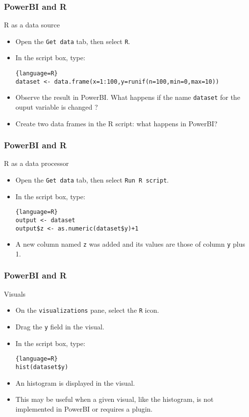 \documentclass[main.tex]{subfiles}
\begin{document}
\begin{frame}[fragile]
    \frametitle{PowerBI and R}
\begin{block}{R as a data source}
    \begin{itemize}
        \item<+-> Open the \texttt{Get data} tab, then select \texttt{R}.
        \item<+-> In the script box, type:
        \begin{lstlisting}{language=R}
dataset <- data.frame(x=1:100,y=runif(n=100,min=0,max=10))
        \end{lstlisting}
        \item<+-> Observe the result in PowerBI. What happens if the name \texttt{dataset} for the ouput variable is changed ?
        \item<+-> Create two data frames in the R script: what happens in PowerBI?
    \end{itemize}
\end{block}
\end{frame}
\begin{frame}[fragile]
    \frametitle{PowerBI and R}
\begin{block}{R as a data processor}
    \begin{itemize}
        \item<+-> Open the \texttt{Get data} tab, then select \texttt{Run R script}.
        \item<+-> In the script box, type:
        \begin{lstlisting}{language=R}
output <- dataset
output$z <- as.numeric(dataset$y)+1
        \end{lstlisting}
        \item<+-> A new column named \texttt{z} was added and its values are those of column \texttt{y} plus 1.
    \end{itemize}
\end{block}
\end{frame}
\begin{frame}[fragile]
    \frametitle{PowerBI and R}
\begin{block}{Visuals}
    \begin{itemize}
        \item<+-> On the \texttt{visualizations} pane, select the \texttt{R} icon.
        \item<+-> Drag the \texttt{y} field in the visual.
        \item<+-> In the script box, type:
        \begin{lstlisting}{language=R}
hist(dataset$y)
        \end{lstlisting}
        \item<+-> An histogram is displayed in the visual. 
        \item<+-> This may be useful when a given visual, like the histogram, is not implemented in PowerBI or requires a plugin.
    \end{itemize}
\end{block}
\end{frame}
\end{document}
